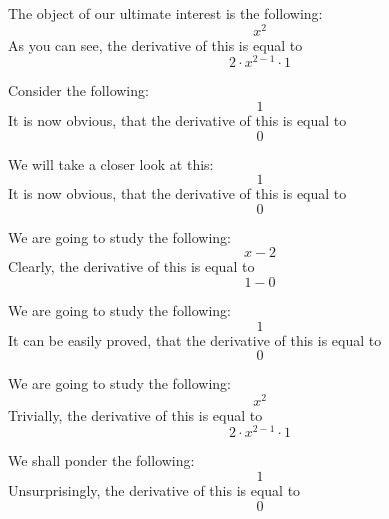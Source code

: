 \documentclass{article}
\begin{document}
The object of our ultimate interest is the following:
\begin{equation}
x ^{2 } 
\end{equation}
As you can see, the derivative of this is equal to
\begin{equation}
2 \cdot x ^{2 - 1 } \cdot 1 
\end{equation}

Consider the following:
\begin{equation}
1 
\end{equation}
It is now obvious, that the derivative of this is equal to
\begin{equation}
0 
\end{equation}

We will take a closer look at this:
\begin{equation}
1 
\end{equation}
It is now obvious, that the derivative of this is equal to
\begin{equation}
0 
\end{equation}

We are going to study the following:
\begin{equation}
x - 2 
\end{equation}
Clearly, the derivative of this is equal to
\begin{equation}
1 - 0 
\end{equation}

We are going to study the following:
\begin{equation}
1 
\end{equation}
It can be easily proved, that the derivative of this is equal to
\begin{equation}
0 
\end{equation}

We are going to study the following:
\begin{equation}
x ^{2 } 
\end{equation}
Trivially, the derivative of this is equal to
\begin{equation}
2 \cdot x ^{2 - 1 } \cdot 1 
\end{equation}

We shall ponder the following:
\begin{equation}
1 
\end{equation}
Unsurprisingly, the derivative of this is equal to
\begin{equation}
0 
\end{equation}
\end{document}
